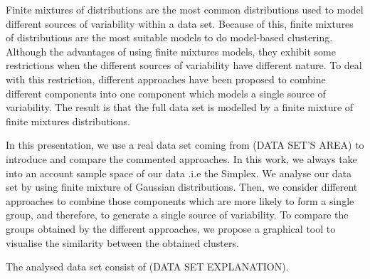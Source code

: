 \documentclass[a4paper,11pt]{article}
\title{}
\author{}
\begin{document}
\maketitle

Finite mixtures of distributions are the most common distributions used to model different sources of variability within a data set. Because of this, finite mixtures of distributions are the most suitable models to do model-based clustering. Although the advantages of using finite mixtures models, they exhibit some restrictions when the different sources of variability have different nature. To deal with this restriction, different approaches have been proposed to combine different components into one component which models a single source of variability. The result is that the full data set is modelled by a finite mixture of finite mixtures distributions.

In this presentation, we use a real data set coming from (DATA SET'S AREA) to introduce and compare the commented approaches. In this work, we always take into an account sample space of our data .i.e the Simplex. We analyse our data set by using finite mixture of Gaussian distributions. Then, we consider different approaches to combine those components which are more likely to form a single group, and therefore, to generate a single source of variability. To compare the groups obtained by the different approaches, we propose a graphical tool to visualise the similarity between the obtained clusters.

The analysed data set consist of (DATA SET EXPLANATION).
\end{document}
